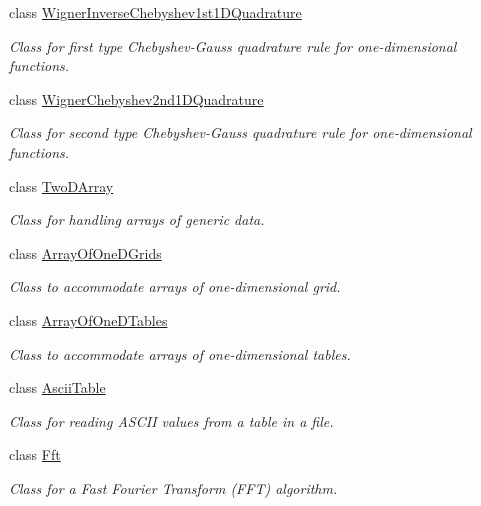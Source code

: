 \begin{DoxyCompactItemize}
class \hyperlink{class_q_u_e_s_o_1_1_wigner_inverse_chebyshev1st1_d_quadrature}{Wigner\-Inverse\-Chebyshev1st1\-D\-Quadrature}
\begin{DoxyCompactList}\small\item\em Class for first type Chebyshev-\/\-Gauss quadrature rule for one-\/dimensional functions. \end{DoxyCompactList}\item 
class \hyperlink{class_q_u_e_s_o_1_1_wigner_chebyshev2nd1_d_quadrature}{Wigner\-Chebyshev2nd1\-D\-Quadrature}
\begin{DoxyCompactList}\small\item\em Class for second type Chebyshev-\/\-Gauss quadrature rule for one-\/dimensional functions. \end{DoxyCompactList}\item 
class \hyperlink{class_q_u_e_s_o_1_1_two_d_array}{Two\-D\-Array}
\begin{DoxyCompactList}\small\item\em Class for handling arrays of generic data. \end{DoxyCompactList}\item 
class \hyperlink{class_q_u_e_s_o_1_1_array_of_one_d_grids}{Array\-Of\-One\-D\-Grids}
\begin{DoxyCompactList}\small\item\em Class to accommodate arrays of one-\/dimensional grid. \end{DoxyCompactList}\item 
class \hyperlink{class_q_u_e_s_o_1_1_array_of_one_d_tables}{Array\-Of\-One\-D\-Tables}
\begin{DoxyCompactList}\small\item\em Class to accommodate arrays of one-\/dimensional tables. \end{DoxyCompactList}\item 
class \hyperlink{class_q_u_e_s_o_1_1_ascii_table}{Ascii\-Table}
\begin{DoxyCompactList}\small\item\em Class for reading A\-S\-C\-I\-I values from a table in a file. \end{DoxyCompactList}\item 
class \hyperlink{class_q_u_e_s_o_1_1_fft}{Fft}
\begin{DoxyCompactList}\small\item\em Class for a Fast Fourier Transform (F\-F\-T) algorithm. \end{DoxyCompactList}\item 

\end{DoxyCompactItemize}
